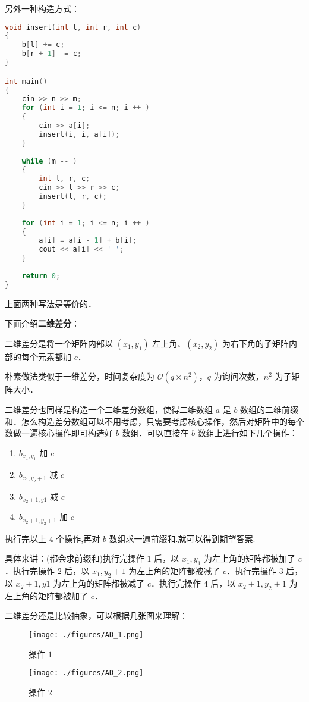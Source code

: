 另外一种构造方式：

\begin{lstlisting}[language=cpp]
void insert(int l, int r, int c)
{
    b[l] += c;
    b[r + 1] -= c;
}

int main()
{
    cin >> n >> m;
    for (int i = 1; i <= n; i ++ ) 
    {
        cin >> a[i];
        insert(i, i, a[i]);
    }
    
    while (m -- )
    {
        int l, r, c;
        cin >> l >> r >> c;
        insert(l, r, c);
    }
    
    for (int i = 1; i <= n; i ++ ) 
    {
        a[i] = a[i - 1] + b[i];
        cout << a[i] << ' ';
    }
    
    return 0;
}
\end{lstlisting}

上面两种写法是等价的．

下面介绍\textbf{二维差分}：

二维差分是将一个矩阵内部以 $(x_1, y_1)$ 左上角、$(x_2, y_2)$ 为右下角的子矩阵内部的每个元素都加 $c$．

朴素做法类似于一维差分，时间复杂度为 $\mathcal{O}(q \times n^2)$，$q$ 为询问次数，$n^2$ 为子矩阵大小．

二维差分也同样是构造一个二维差分数组，使得二维数组 $a$ 是 $b$ 数组的二维前缀和．怎么构造差分数组可以不用考虑，只需要考虑核心操作，然后对矩阵中的每个数做一遍核心操作即可构造好 $b$ 数组．可以直接在 $b$ 数组上进行如下几个操作：

\begin{enumerate}
\item $b_{x_1, y_1}$ 加 $c$
\item $b_{x_1, y_2 + 1}$ 减 $c$ 
\item $b_{x_2 + 1, y1}$ 减 $c$
\item $b_{x_2 + 1, y_2 + 1}$ 加 $c$
\end{enumerate}

执行完以上 $4$ 个操作,再对 $b$ 数组求一遍前缀和.就可以得到期望答案. 

具体来讲：(都会求前缀和)执行完操作 $1$ 后，以 $x_1, y_1$ 为左上角的矩阵都被加了 $c$．执行完操作 $2$ 后，以 $x_1, y_2 + 1$ 为左上角的矩阵都被减了 $c$．执行完操作 $3$ 后，以 $x_2 + 1, y1$ 为左上角的矩阵都被减了 $c$．执行完操作 $4$ 后，以 $x_2 + 1, y_2 + 1$ 为左上角的矩阵都被加了 $c$．

二维差分还是比较抽象，可以根据几张图来理解：

\begin{figure}[ht]
\centering
\texttt{[image: ./figures/AD\_1.png]}
\caption{操作 $1$} \label{AD_fig1}
\end{figure}

\begin{figure}[ht]
\centering
\texttt{[image: ./figures/AD\_2.png]}
\caption{操作 $2$} \label{AD_fig2}
\end{figure}

